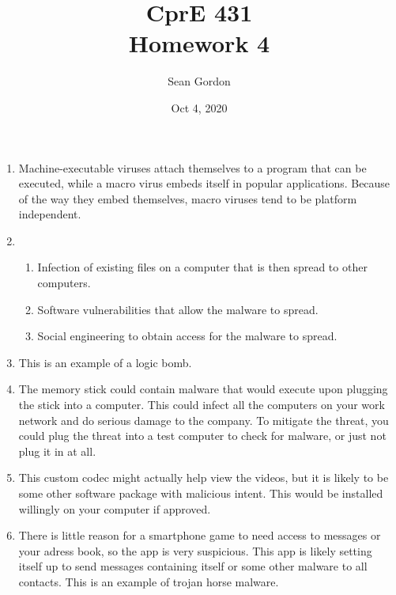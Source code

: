 \documentclass[12pt]{article}
\title{CprE 431\\Homework 4}
\author{Sean Gordon}
\date{Oct 4, 2020}
\begin{document}
\maketitle


 \begin{enumerate}
    \item Machine-executable viruses attach themselves to a program that can be executed, while a macro virus embeds itself in popular applications. Because of the way they embed themselves, macro viruses tend to be platform independent.\\
   
    \item \begin{enumerate}
	\item Infection of existing files on a computer that is then spread to other computers.
	\item Software vulnerabilities that allow the malware to spread.
	\item Social engineering to obtain access for the malware to spread.\\
   	\end{enumerate}
   
    \item This is an example of a logic bomb.\\
   	
    \item The memory stick could contain malware that would execute upon plugging the stick into a computer. This could infect all the computers on your work network and do serious damage to the company. To mitigate the threat, you could plug the threat into a test computer to check for malware, or just not plug it in at all.\\
    
    \item This custom codec might actually help view the videos, but it is likely to be some other software package with malicious intent. This would be installed willingly on your computer if approved.\\

    \item There is little reason for a smartphone game to need access to messages or your adress book, so the app is very suspicious. This app is likely setting itself up to send messages containing itself or some other malware to all contacts. This is an example of trojan horse malware.\\
    

\end{enumerate}
\end{document}
